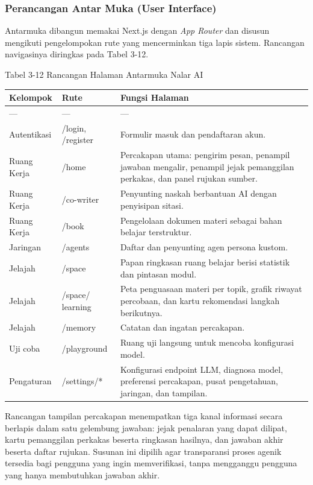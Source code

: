 \documentclass[12pt,a4paper]{article}
\begin{document}
\subsubsection*{Perancangan Antar Muka (User Interface)}
Antarmuka dibangun memakai Next.js dengan \textit{App Router} dan disusun mengikuti pengelompokan rute yang mencerminkan tiga lapis sistem. Rancangan navigasinya diringkas pada Tabel 3-12.

Tabel 3-12	Rancangan Halaman Antarmuka Nalar AI

\begin{table}[h]
\centering
\begin{tabular}{lll}
\toprule
Kelompok & Rute & Fungsi Halaman \\
\midrule
--- & --- & --- \\
Autentikasi & /login, /register & Formulir masuk dan pendaftaran akun. \\
Ruang Kerja & /home & Percakapan utama: pengirim pesan, penampil jawaban mengalir, penampil jejak pemanggilan perkakas, dan panel rujukan sumber. \\
Ruang Kerja & /co-writer & Penyunting naskah berbantuan AI dengan penyisipan sitasi. \\
Ruang Kerja & /book & Pengelolaan dokumen materi sebagai bahan belajar terstruktur. \\
Jaringan & /agents & Daftar dan penyunting agen persona kustom. \\
Jelajah & /space & Papan ringkasan ruang belajar berisi statistik dan pintasan modul. \\
Jelajah & /space/ learning & Peta penguasaan materi per topik, grafik riwayat percobaan, dan kartu rekomendasi langkah berikutnya. \\
Jelajah & /memory & Catatan dan ingatan percakapan. \\
Uji coba & /playground & Ruang uji langsung untuk mencoba konfigurasi model. \\
Pengaturan & /settings/* & Konfigurasi endpoint LLM, diagnosa model, preferensi percakapan, pusat pengetahuan, jaringan, dan tampilan. \\
\bottomrule
\end{tabular}
\end{table}
Rancangan tampilan percakapan menempatkan tiga kanal informasi secara berlapis dalam satu gelembung jawaban: jejak penalaran yang dapat dilipat, kartu pemanggilan perkakas beserta ringkasan hasilnya, dan jawaban akhir beserta daftar rujukan. Susunan ini dipilih agar transparansi proses agenik tersedia bagi pengguna yang ingin memverifikasi, tanpa mengganggu pengguna yang hanya membutuhkan jawaban akhir.
\end{document}
